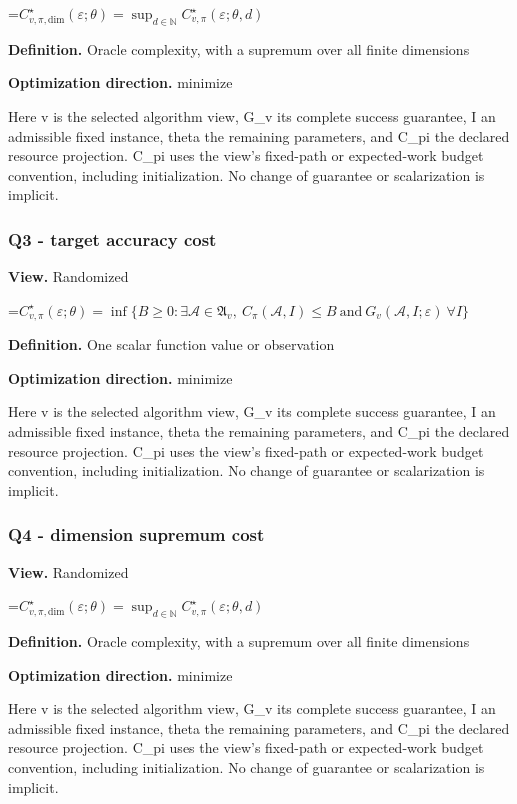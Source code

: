 \documentclass[10pt,a4paper]{article}
\newcommand{\AtlasMath}[1]{\par\begingroup\centering\setbox0=\hbox{$\displaystyle #1$}\ifdim\wd0>1.4\linewidth\typeout{ATLAS WIDE FORMULA: \the\wd0}\fi\ifdim\wd0>\linewidth\resizebox{\linewidth}{!}{\box0}\else\box0\fi\par\endgroup}
\begin{document}
\AtlasMath{C^\star_{v,\pi,\mathrm{dim}}(\varepsilon;\theta)=\sup_{d\in\mathbb N}C^\star_{v,\pi}(\varepsilon;\theta,d)}
\textbf{Definition.} Oracle complexity, with a supremum over all finite dimensions

\textbf{Optimization direction.} minimize

Here v is the selected algorithm view, G\_v its complete success guarantee, I an admissible fixed instance, theta the remaining parameters, and C\_pi the declared resource projection. C\_pi uses the view's fixed-path or expected-work budget convention, including initialization. No change of guarantee or scalarization is implicit.

\subsubsection{Q3 - target accuracy cost}
\textbf{View.} Randomized

\AtlasMath{C^\star_{v,\pi}(\varepsilon;\theta)=\inf\{B\ge0:\exists\mathcal A\in\mathfrak A_v,\ C_\pi(\mathcal A,I)\le B\ \text{and}\ G_v(\mathcal A,I;\varepsilon)\ \forall I\}}
\textbf{Definition.} One scalar function value or observation

\textbf{Optimization direction.} minimize

Here v is the selected algorithm view, G\_v its complete success guarantee, I an admissible fixed instance, theta the remaining parameters, and C\_pi the declared resource projection. C\_pi uses the view's fixed-path or expected-work budget convention, including initialization. No change of guarantee or scalarization is implicit.

\subsubsection{Q4 - dimension supremum cost}
\textbf{View.} Randomized

\AtlasMath{C^\star_{v,\pi,\mathrm{dim}}(\varepsilon;\theta)=\sup_{d\in\mathbb N}C^\star_{v,\pi}(\varepsilon;\theta,d)}
\textbf{Definition.} Oracle complexity, with a supremum over all finite dimensions

\textbf{Optimization direction.} minimize

Here v is the selected algorithm view, G\_v its complete success guarantee, I an admissible fixed instance, theta the remaining parameters, and C\_pi the declared resource projection. C\_pi uses the view's fixed-path or expected-work budget convention, including initialization. No change of guarantee or scalarization is implicit.
\end{document}
